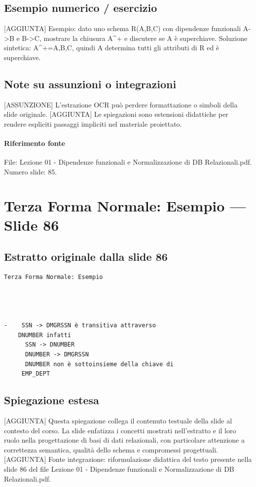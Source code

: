 \documentclass[11pt]{article}
\begin{document}
\subsection*{Esempio numerico / esercizio}
[AGGIUNTA] Esempio: dato uno schema R(A,B,C) con dipendenze funzionali A->B e B->C, mostrare la chiusura A^+ e discutere se A è superchiave. Soluzione sintetica: A^+={A,B,C}, quindi A determina tutti gli attributi di R ed è superchiave.
\subsection*{Note su assunzioni o integrazioni}
[ASSUNZIONE] L'estrazione OCR può perdere formattazione o simboli della slide originale.
[AGGIUNTA] Le spiegazioni sono estensioni didattiche per rendere espliciti passaggi impliciti nel materiale proiettato.
\paragraph{Riferimento fonte} File: Lezione 01 - Dipendenze funzionali e Normalizzazione di DB Relazionali.pdf. Numero slide: 85.
\section{Terza Forma Normale: Esempio --- Slide 86}
\subsection*{Estratto originale dalla slide 86}
\begin{lstlisting}
Terza Forma Normale: Esempio




-    SSN -> DMGRSSN è transitiva attraverso
    DNUMBER infatti
      SSN -> DNUMBER
      DNUMBER -> DMGRSSN
      DNUMBER non è sottoinsieme della chiave di
     EMP_DEPT
\end{lstlisting}
\subsection*{Spiegazione estesa}
[AGGIUNTA] Questa spiegazione collega il contenuto testuale della slide al contesto del corso. La slide enfatizza i concetti mostrati nell'estratto e il loro ruolo nella progettazione di basi di dati relazionali, con particolare attenzione a correttezza semantica, qualità dello schema e compromessi progettuali.
[AGGIUNTA] Fonte integrazione: riformulazione didattica del testo presente nella slide 86 del file Lezione 01 - Dipendenze funzionali e Normalizzazione di DB Relazionali.pdf.
\end{document}
